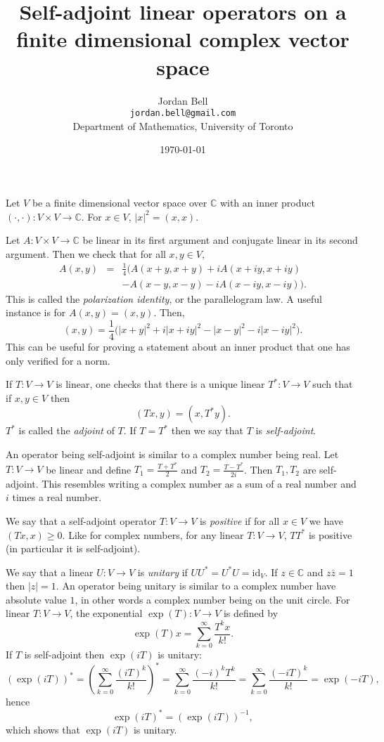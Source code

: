 \documentclass{article}
\newcommand{\id}{\textrm{id}}
\begin{document}
\title{Self-adjoint linear operators on a finite dimensional complex vector space}
\author{Jordan Bell\\ \texttt{jordan.bell@gmail.com}\\Department of Mathematics, University of Toronto}
\date{\today}

\maketitle

Let $V$ be a finite dimensional vector space over $\mathbb{C}$ with an inner product $(\cdot,\cdot):V \times V \to \mathbb{C}$. For $x \in V$, $|x|^2=(x,x)$. 

Let $A:V \times V \to \mathbb{C}$ be linear in its first argument and conjugate linear in its second argument. Then we check that for
all $x,y \in V$,
\begin{eqnarray*}
A(x,y)&=&\frac{1}{4}\Big( A(x+y,x+y)+iA(x+iy,x+iy)\\
&&-A(x-y,x-y)-iA(x-iy,x-iy) \Big).
\end{eqnarray*}
This is called the {\em polarization identity}, or the parallelogram law. A useful instance  is for $A(x,y)=(x,y)$. Then,
\[
(x,y)=\frac{1}{4}\Big( |x+y|^2+i|x+iy|^2-|x-y|^2-i|x-iy|^2 \Big).
\]
This can be useful for proving a statement about an inner product that one has only verified for a norm. 

If $T:V \to V$ is linear, one checks that there is a unique linear $T^*:V \to V$ such that if $x,y \in V$ then
\[
(Tx,y)=(x,T^*y).
\]
$T^*$ is called the {\em adjoint} of $T$. If $T=T^*$ then we say that $T$ is {\em self-adjoint}.

An operator being self-adjoint is similar to a complex number being real. 
Let $T:V \to V$ be linear and define $T_1=\frac{T+T^*}{2}$ and $T_2=\frac{T-T^*}{2i}$. Then $T_1,T_2$ are self-adjoint. This resembles writing a complex number as a sum of
a real number and $i$ times a real number.

We say that a self-adjoint operator $T:V \to V$ is {\em positive} if for all $x \in V$ we have $(Tx,x) \geq 0$. 
Like for complex numbers, for any linear $T:V \to V$, $TT^*$ is positive (in particular it is self-adjoint).

We say that a linear $U:V \to V$ is {\em unitary} if $UU^*=U^*U=\id_V$. If $z \in \mathbb{C}$ and $z\overline{z}=1$ then $|z|=1$. An operator being unitary is similar to a complex number have absolute value $1$, in other words a complex
number being on the unit circle. For linear $T:V \to V$, the exponential $\exp(T):V \to V$ is defined by
\[
\exp(T)x=\sum_{k=0}^\infty \frac{T^k x}{k!}.
\]
If $T$ is self-adjoint then $\exp(iT)$ is unitary:
\[
(\exp(iT))^*=\left( \sum_{k=0}^\infty \frac{(iT)^k}{k!} \right)^*=\sum_{k=0}^\infty \frac{(-i)^k T^k}{k!}=\sum_{k=0}^\infty \frac{(-iT)^k}{k!}=\exp(-iT),
\]
hence
\[
\exp(iT)^*=(\exp(iT))^{-1},
\]
which shows that $\exp(iT)$ is unitary.
\end{document}
